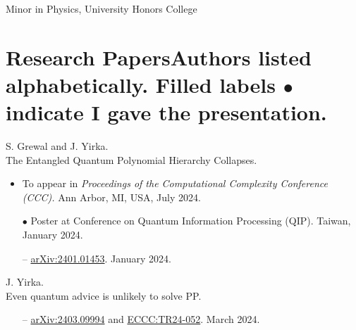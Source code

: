 \documentclass[11pt,letterpaper,serif]{moderncv}
\newcommand{\pubItemSep}{0em}
\begin{document}
\vspace{-\parsep}
{%
}
{
	\begin{adjustwidth}{.25in}{}
		Minor in Physics, University Honors College
	\end{adjustwidth}
}

\section{Research Papers\hfill{\footnotesize Authors listed alphabetically. Filled labels $\bullet$ indicate I gave the presentation.}}


S. Grewal and J. Yirka.
\\The Entangled Quantum Polynomial Hierarchy Collapses.
\begin{adjustwidth}{.1in}{}
	\begin{itemize}[itemsep=\pubItemSep]
		\item To appear in \textit{Proceedings of the Computational Complexity Conference (CCC).} Ann Arbor, MI, USA, July 2024.
		\item[$\bullet$] Poster at Conference on Quantum Information Processing (QIP). Taiwan, January 2024.
		\item[--] \href{https://arxiv.org/abs/2401.01453}{arXiv:2401.01453}. January 2024.
	\end{itemize}
\end{adjustwidth}
\vspace{\parsep}

J. Yirka.
\\Even quantum advice is unlikely to solve \textup{PP}.
\begin{adjustwidth}{.1in}{}
	\begin{itemize}[itemsep=\pubItemSep]
		\item[--] \href{https://arxiv.org/abs/2403.09994}{arXiv:2403.09994} and \href{https://eccc.weizmann.ac.il/report/2024/052/}{ECCC:TR24-052}. March 2024.
	\end{itemize}
\end{adjustwidth}
\vspace{\parsep}
\end{document}
